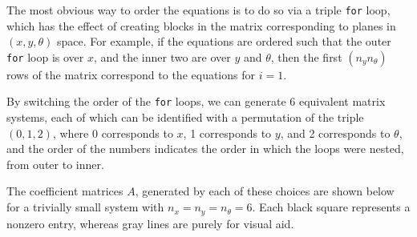 The most obvious way to order the equations is to do so via a triple \texttt{for} loop, which has the effect of creating blocks in the matrix corresponding to planes in $(x,y,\theta)$ space.
For example, if the equations are ordered such that the outer \texttt{for} loop is over $x$, and the inner two are over $y$ and $\theta$, then the first $(n_y n_\theta)$ rows of the matrix correspond to the equations for $i=1$.

By switching the order of the \texttt{for} loops, we can generate 6 equivalent matrix systems, each of which can be identified with a permutation of the triple $(0,1,2)$, where 0 corresponds to $x$, 1 corresponds to $y$, and 2 corresponds to $\theta$, and the order of the numbers indicates the order in which the loops were nested, from outer to inner.

The coefficient matrices $A$, generated by each of these choices are shown below for a trivially small system with $n_x=n_y=n_\theta=6$.
Each black square represents a nonzero entry, whereas gray lines are purely for visual aid.

\pagebreak
